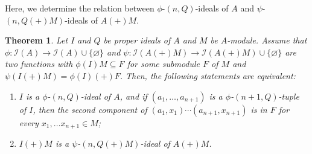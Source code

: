 \documentclass[preprint,review,10pt]{amsart}
\newtheorem{theorem}{Theorem}[section]
\theoremstyle{definition}
\theoremstyle{remark}
\numberwithin{equation}{section}
\begin{document}
 Here, we determine the relation between $\phi$-$(n,Q)$-ideals of $A$ and $\psi$-$(n,Q(+)M)$-ideals of $A(+)M$. 
 \begin{theorem} \label{idealization}
 Let $I$ and $Q$ be proper  ideals of $A$ and $M$ be  $A$-module. Assume that  $\phi: \mathcal{I}(A) \to \mathcal{I}(A) \cup \{\varnothing\}$ and $\psi: \mathcal{I}(A(+)M) \to \mathcal{I}(A(+)M) \cup \{\varnothing\}$ are two  functions with  $\phi(I)M\subseteq F$ for some submodule $F$ of $M$ and $\psi(I (+) M)=\phi(I) (+) F$. Then, the following statements are equivalent:
\begin{enumerate}
\item   $I$ is a $\phi$-$(n,Q)$-ideal of $A$, and if  $(a_1,\ldots,a_{n+1})$  is a $\phi$-$(n+1,Q)$-tuple of $I$, then the second component of $(a_1, x_1)\cdots (a_{n+1},x_{n+1})$ is in $F$ for every $x_1,\ldots x_{n+1} \in M$;
\item $I(+)M$ is a $\psi$-$(n,Q(+)M)$-ideal of  $A(+)M$.
\end{enumerate}
 \end{theorem}
\end{document}
